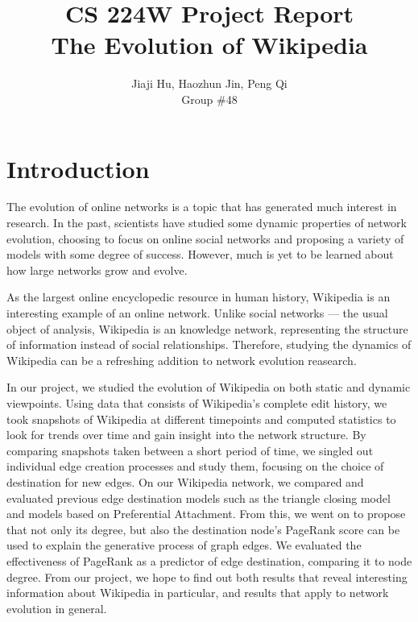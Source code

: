 \documentclass[10pt,twocolumn]{article}
\begin{document}
\title{CS 224W Project Report\\ The Evolution of Wikipedia}
\author{Jiaji Hu, Haozhun Jin, Peng Qi\\Group \#48}
\date{}
\maketitle

\section{Introduction}

The evolution of online networks is a topic that has generated much interest in research. In the past, scientists have studied some dynamic properties of network evolution, choosing to focus on online social networks and proposing a variety of models with some degree of success. However, much is yet to be learned about how large networks grow and evolve.

As the largest online encyclopedic resource in human history, Wikipedia is an interesting example of an online network. Unlike social networks --- the usual object of analysis, Wikipedia is an knowledge network, representing the structure of information instead of social relationships. Therefore, studying the dynamics of Wikipedia can be a refreshing addition to network evolution reasearch.

In our project, we studied the evolution of Wikipedia on both static and dynamic viewpoints. Using data that consists of Wikipedia's complete edit history, we took snapshots of Wikipedia at different timepoints and computed statistics to look for trends over time and gain insight into the network structure. By comparing snapshots taken between a short period of time, we singled out individual edge creation processes and study them, focusing on the choice of destination for new edges. On our Wikipedia network, we compared and evaluated previous edge destination models such as the triangle closing model and models based on Preferential Attachment. From this, we went on to propose that not only its degree, but also the destination node's PageRank score can be used to explain the generative process of graph edges. We evaluated the effectiveness of PageRank as a predictor of edge destination, comparing it to node degree. From our project, we hope to find out both results that reveal interesting information about Wikipedia in particular, and results that apply to network evolution in general.
\end{document}
